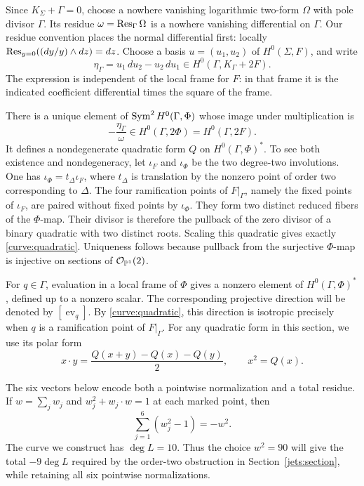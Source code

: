Since $K_\Sigma+\Gamma=0$, choose a nowhere vanishing logarithmic
two-form $\Omega$ with pole divisor $\Gamma$.  Its residue
$\omega=\operatorname{Res}_\Gamma\Omega$ is a nowhere vanishing differential on
$\Gamma$.  Our residue convention places the normal differential
first: locally $\operatorname{Res}_{y=0}((dy/y)\wedge dz)=dz$.
Choose a basis $u=(u_1,u_2)$ of $H^0(\Sigma,F)$, and write
\[
  \eta_\Gamma=u_1\,du_2-u_2\,du_1
       \in H^0(\Gamma,K_\Gamma+2F).
\]
The expression is independent of the local frame for $F$: in that
frame it is the indicated coefficient differential times the square
of the frame.

There is a unique element of $\operatorname{Sym}^2H^0(\Gamma,\Phi)$ whose image under
multiplication is
\begin{equation}\label{curve:quadratic}
  -\frac{\eta_\Gamma}{\omega}\in H^0(\Gamma,2\Phi)
       =H^0(\Gamma,2F).
\end{equation}
It defines a nondegenerate quadratic form $Q$ on
$H^0(\Gamma,\Phi)^*$.  To see both existence and nondegeneracy, let
$\iota_F$ and $\iota_\Phi$ be the two degree-two involutions.  One has
$\iota_\Phi=t_\Delta\iota_F$, where $t_\Delta$ is translation by the
nonzero point of order two corresponding to $\Delta$.  The four
ramification points of $F|_\Gamma$, namely the fixed points of
$\iota_F$, are paired without fixed points by $\iota_\Phi$.  They form
two distinct reduced fibers of the $\Phi$-map.  Their divisor is
therefore the pullback of the zero divisor of a binary quadratic with
two distinct roots.  Scaling this quadratic gives exactly
\eqref{curve:quadratic}.  Uniqueness follows because pullback from the
surjective $\Phi$-map is injective on sections of $\mathcal O_{\mathbb P^1}(2)$.

For $q\in\Gamma$, evaluation in a local frame of $\Phi$ gives a
nonzero element of $H^0(\Gamma,\Phi)^*$, defined up to a nonzero scalar.
The corresponding projective direction will be denoted by
$[\operatorname{ev}_q]$.  By \eqref{curve:quadratic}, this direction is
isotropic precisely when $q$ is a ramification point of $F|_\Gamma$.
For any quadratic form in this section, we use its polar form
\[
 x\mathbin{\cdot}y=\frac{Q(x+y)-Q(x)-Q(y)}2,
 \qquad x^2=Q(x).
\]

The six vectors below encode both a pointwise normalization and a total
residue.  If $w=\sum_jw_j$ and $w_j^2+w_j\mathbin{\cdot}w=1$ at
each marked point, then
\[
 \sum_{j=1}^6(w_j^2-1)=-w^2.
\]
The curve we construct has $\deg L=10$.  Thus the choice $w^2=90$
will give the total $-9\deg L$ required by the order-two obstruction
in Section~\ref{jets:section}, while retaining all six pointwise
normalizations.

